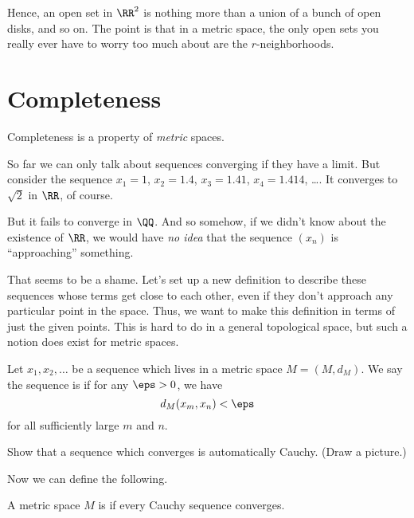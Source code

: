 Hence, an open set in $\RR^2$ is nothing more than a union
of a bunch of open disks, and so on.
The point is that in a metric space, the only open sets you really
ever have to worry too much about are the $r$-neighborhoods.


\section{Completeness}
Completeness is a property of \emph{metric} spaces.

So far we can only talk about sequences converging if they have a limit.
But consider the sequence $x_1 = 1$, $x_2 = 1.4$, $x_3 = 1.41$, $x_4 = 1.414$, \dots.
It converges to $\sqrt 2$ in $\RR$, of course.

But it fails to converge in $\QQ$.
And so somehow, if we didn't know about the existence of $\RR$, we would
have \emph{no idea} that the sequence $(x_n)$ is ``approaching'' something.

That seems to be a shame.
Let's set up a new definition to describe these sequences whose terms
get close to each other,
even if they don't approach any particular point in the space.
Thus, we want to make this definition in terms of just the given points.
This is hard to do in a general topological space,
but such a notion does exist for metric spaces.

\begin{definition}
	Let $x_1, x_2, \dots$ be a sequence which lives in a metric space $M = (M,d_M)$.
	We say the sequence is  if for any $\eps > 0$, we have
	\[ d_M(x_m, x_n) < \eps \]
	for all sufficiently large $m$ and $n$.
\end{definition}

\begin{ques}
	Show that a sequence which converges is automatically Cauchy.
	(Draw a picture.)
\end{ques}

Now we can define the following.
\begin{definition}
	A metric space $M$ is  if every
	Cauchy sequence converges.
\end{definition}


